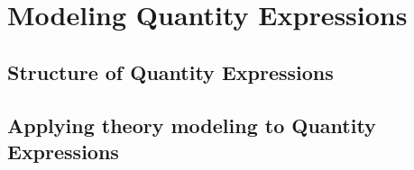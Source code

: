 \section{Modeling Quantity Expressions}
\subsection{Structure of Quantity Expressions}
\subsection{Applying theory modeling to Quantity Expressions}
